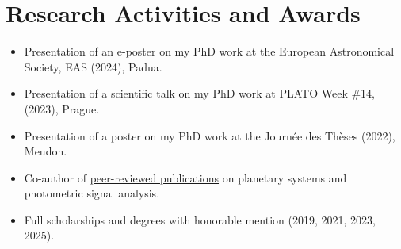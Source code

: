 \documentclass[10pt,a4paper]{article}
\begin{document}
\section*{Research Activities and Awards}
\begin{itemize}[leftmargin=1.5em]
    \item Presentation of an e-poster on my PhD work at the European Astronomical Society, EAS (2024), Padua.
    \item Presentation of a scientific talk on my PhD work at PLATO Week \#14, (2023), Prague.
    \item Presentation of a poster on my PhD work at the Journée des Thèses (2022), Meudon.
    \item Co-author of \href{https://ui.adsabs.harvard.edu/search/fq=%7B!type%3Daqp%20v%3D%24fq_database%7D&fq_database=(database%3Aastronomy%20OR%20database%3Aphysics)&q=%20author%3A%22Guti%C3%A9rrez-Canales%2C%20Fernando%22&sort=date%20desc%2C%20bibcode%20desc&p_=0}{peer-reviewed publications} on planetary systems and photometric signal analysis.
    \item Full scholarships and degrees with honorable mention (2019, 2021, 2023, 2025).
\end{itemize}
\end{document}
